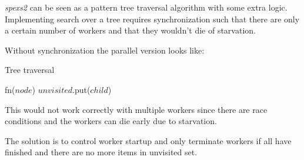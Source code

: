 \emph{spexs2} can be seen as a pattern tree traversal algorithm with some extra logic. Implementing search over a tree requires synchronization such that there are only a certain number of workers and that they wouldn't die of starvation.

Without synchronization the parallel version looks like:

\begin{algorithm}[H]
    \caption{Tree traversal}
\begin{algorithmic}[1]

        
        \Spawn
                \State fn($node$)
                        \State $unvisited$.put($child$)
                    \EndIf
                \EndFor
            \EndWhile
        \EndSpawn

    \EndFunction
\end{algorithmic}
\end{algorithm}

This would not work correctly with multiple workers since there are race conditions and the workers can die early due to starvation.

The solution is to control worker startup and only terminate workers if all have finished and there are no more items in unvisited set.

